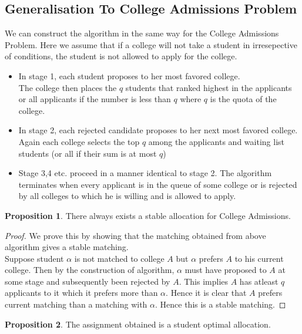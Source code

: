 \documentclass{article}
\theoremstyle{definition}
\newtheorem{prop}{Proposition}[section]
\begin{document}
\subsection{Generalisation To College Admissions Problem}
We can construct the algorithm in the same way for the College Admissions Problem. Here we assume that if a college will not take a student in irresepective of conditions, the student is not allowed to apply for the college.
\begin{itemize}
	\item In stage 1, each student proposes to her most favored college.\\
	The college then places the $q$ students that ranked highest in the applicants or all applicants if the number is less than $q$ where $q$ is the quota of the college.
	\item  In stage 2, each rejected candidate proposes to her next most favored college.\\
	Again each college selects the top $q$ among the applicants and waiting list students (or all if their sum is at most $q$)
	\item Stage 3,4 etc. proceed in a manner identical to stage 2. The algorithm terminates when every applicant is in the queue of some college or is rejected by all colleges to which he is willing and is allowed to apply.
\end{itemize}
\begin{prop}
There always exists a stable allocation for College Admissions.
\end{prop}
\begin{proof}
We prove this by showing that the matching obtained from above algorithm gives a stable matching.\\
Suppose student $\alpha$ is not matched to college $A$ but $\alpha$ prefers $A$ to his current college. Then by the construction of algorithm, $\alpha$ must have proposed to $A$ at some stage and subsequently been rejected by $A$. This implies $A$ has atleast $q$ applicants to it which it prefers more than $\alpha$. Hence it is clear that $A$ prefers current matching than a matching with $\alpha$. Hence this is a stable matching.
\end{proof}
\begin{prop}
The assignment obtained is a student optimal allocation.
\end{prop}
\end{document}
